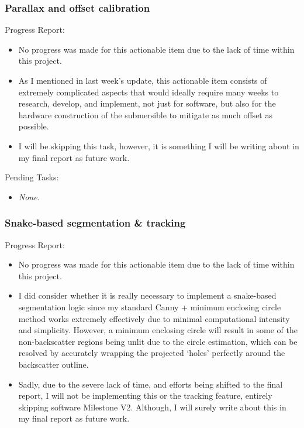 \subsubsection{Parallax and offset calibration}

Progress Report:

\begin{itemize}
    \item No progress was made for this actionable item due to the lack of time within this project.
    \item As I mentioned in last week's update, this actionable item consists of extremely complicated aspects that would ideally require many weeks to research, develop, and implement, not just for software, but also for the hardware construction of the submersible to mitigate as much offset as possible.
    \item I will be skipping this task, however, it is something I will be writing about in my final report as future work.
\end{itemize}

Pending Tasks:

\begin{itemize}
    \item \textit{None.}
\end{itemize}




\subsubsection{Snake-based segmentation \& tracking}

Progress Report:

\begin{itemize}
    \item No progress was made for this actionable item due to the lack of time within this project.
    \item I did consider whether it is really necessary to implement a snake-based segmentation logic since my standard Canny + minimum enclosing circle method works extremely effectively due to minimal computational intensity and simplicity. However, a minimum enclosing circle will result in some of the non-backscatter regions being unlit due to the circle estimation, which can be resolved by accurately wrapping the projected `holes' perfectly around the backscatter outline.
    \item Sadly, due to the severe lack of time, and efforts being shifted to the final report, I will not be implementing this or the tracking feature, entirely skipping software Milestone V2. Although, I will surely write about this in my final report as future work.
\end{itemize}

